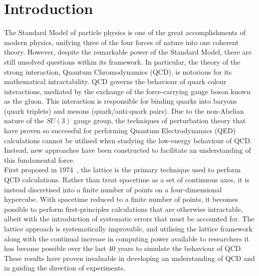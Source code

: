 
\chapter{Introduction}\label{chapter:Introduction}
\ifpdf
    \graphicspath{{Chapter1/Figs/Raster/}{Chapter1/Figs/PDF/}{Chapter1/Figs/}}
\else
    \graphicspath{{Chapter1/Figs/Vector/}{Chapter1/Figs/}}
\fi

The Standard Model of particle physics is one of the great accomplishments of modern physics, unifying three of the four forces of nature into one coherent theory. However, despite the remarkable power of the Standard Model, there are still unsolved questions within its framework. In particular, the theory of the strong interaction, Quantum Chromodynamics (QCD), is notorious for its mathematical intractability. QCD governs the behaviour of quark colour interactions, mediated by the exchange of the force-carrying gauge boson known as the gluon. This interaction is responsible for binding quarks into baryons (quark triplets) and mesons (quark/anti-quark pairs). Due to the non-Abelian nature of the $SU(3)$ gauge group, the techniques of perturbation theory that have proven so successful for performing Quantum Electrodynamics (QED) calculations cannot be utilised when studying the low-energy behaviour of QCD. Instead, new approaches have been constructed to facilitate an understanding of this fundamental force.\\

First proposed in 1974~\cite{Wilson:1974sk}, the lattice is the primary technique used to perform QCD calculations. Rather than treat spacetime as a set of continuous axes, it is instead discretised into a finite number of points on a four-dimensional hypercube. With spacetime reduced to a finite number of points, it becomes possible to perform first-principles calculations that are otherwise intractable, albeit with the introduction of systematic errors that must be accounted for. The lattice approach is systematically improvable, and utilising the lattice framework along with the continual increase in computing power available to researchers it has become possible over the last 40 years to simulate the behaviour of QCD. These results have proven invaluable in developing an understanding of QCD and in guiding the direction of experiments.\\

